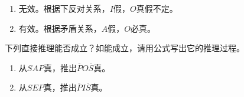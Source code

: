 \documentclass{ctexart}
\begin{document}
\begin{solution}
  \begin{enumerate}
    \item 无效。根据下反对关系，\(I\)假，\(O\)真假不定。
    \item 有效。根据矛盾关系，\(A\)假，\(O\)必真。
  \end{enumerate}
\end{solution}
\begin{problem}\label{pro:4}
  下列直接推理能否成立？如能成立，请用公式写出它的推理过程。
  \begin{enumerate}
    \item 从\(SAP\)真，推出\(\overline{P}O \overline{S}\)真。
    \item 从\(SEP\)真，推出\(\overline{P}I \overline{S}\)真。
  \end{enumerate}
\end{problem}
\end{document}
